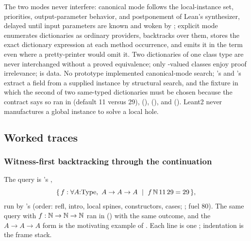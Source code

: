 The two modes never interfere: canonical mode follows the local-instance set, priorities, output-parameter behavior, and postponement of Lean's synthesizer, delayed until input parameters are known and woken by ; explicit mode enumerates dictionaries as ordinary providers, backtracks over them, stores the exact dictionary expression at each method occurrence, and emits it in the term even where a pretty-printer would omit it. Two dictionaries of one class type are never interchanged without a proved equivalence; only -valued classes enjoy proof irrelevance;  is data. No prototype implemented canonical-mode search; 's  and 's  extract a field from a supplied instance by structural search, and the fixture in which the second of two same-typed dictionaries must be chosen because the contract says so ran in  (default 11 versus 29),  (),  (), and  (). Leant2 never manufactures a global instance to solve a local hole.

\subsection{Worked traces}\label{alg:traces}

\subsubsection{Witness-first backtracking through the continuation}

The query is 's ,
\[
 \{\,f : \forall A{:}\mathrm{Type},\ A \to A \to A \ \mid\ f\,\mathbb{N}\,11\,29 = 29\,\},
\]
run by 's  (order: refl, intro, local spines, constructors, cases; ; fuel 80). The same query with $f:\mathbb{N}\to\mathbb{N}\to\mathbb{N}$ ran in  () with the same outcome, and the $A\to A\to A$ form is the motivating example of . Each line is one ; indentation is the frame stack.


